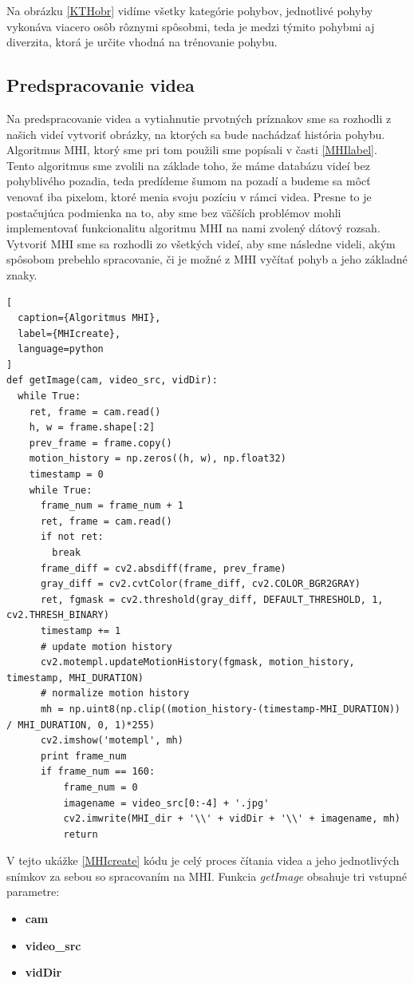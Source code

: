 Na obrázku \ref{KTHobr} vidíme všetky kategórie pohybov, jednotlivé pohyby vykonáva viacero osôb rôznymi spôsobmi, teda je medzi týmito pohybmi aj diverzita, ktorá je určite vhodná na trénovanie pohybu. 

\subsection{Predspracovanie videa}
Na predspracovanie videa a vytiahnutie prvotných príznakov sme sa rozhodli z našich videí vytvoriť obrázky, na ktorých sa bude nachádzať história pohybu. Algoritmus MHI, ktorý sme pri tom použili sme popísali v časti \ref{MHIlabel}. Tento algoritmus sme zvolili na základe toho, že máme databázu videí bez pohyblivého pozadia, teda predídeme šumom na pozadí a budeme sa môcť venovať iba pixelom, ktoré menia svoju pozíciu v rámci videa. Presne to je postačujúca podmienka na to, aby sme bez väčších problémov mohli implementovať funkcionalitu algoritmu MHI na nami zvolený dátový rozsah. Vytvoriť MHI sme sa rozhodli zo všetkých videí, aby sme následne videli, akým spôsobom prebehlo spracovanie, či je možné z MHI vyčítať pohyb a jeho základné znaky. 

\begin{lstlisting}[
  caption={Algoritmus MHI},
  label={MHIcreate},
  language=python
]
def getImage(cam, video_src, vidDir):
  while True:    
    ret, frame = cam.read()
    h, w = frame.shape[:2]
    prev_frame = frame.copy()
    motion_history = np.zeros((h, w), np.float32)
    timestamp = 0
    while True:
      frame_num = frame_num + 1
      ret, frame = cam.read()
      if not ret:
        break
      frame_diff = cv2.absdiff(frame, prev_frame)
      gray_diff = cv2.cvtColor(frame_diff, cv2.COLOR_BGR2GRAY)
      ret, fgmask = cv2.threshold(gray_diff, DEFAULT_THRESHOLD, 1, cv2.THRESH_BINARY)
      timestamp += 1
      # update motion history
      cv2.motempl.updateMotionHistory(fgmask, motion_history, timestamp, MHI_DURATION)
      # normalize motion history
      mh = np.uint8(np.clip((motion_history-(timestamp-MHI_DURATION)) / MHI_DURATION, 0, 1)*255)
      cv2.imshow('motempl', mh)
      print frame_num
      if frame_num == 160:
          frame_num = 0
          imagename = video_src[0:-4] + '.jpg'
          cv2.imwrite(MHI_dir + '\\' + vidDir + '\\' + imagename, mh)
          return
\end{lstlisting}


V tejto ukážke \ref{MHIcreate} kódu je celý proces čítania videa a jeho jednotlivých snímkov za sebou so spracovaním na MHI. Funkcia \textit{getImage} obsahuje tri vstupné parametre:
\begin{itemize}
\item \textbf{cam}
\item \textbf{video\_src}
\item \textbf{vidDir}
\end{itemize}

